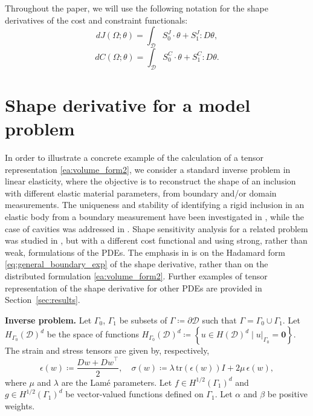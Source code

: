 \documentclass[preprint,9pt]{elsarticle}
\begin{document}
Throughout the paper, we will use the following notation for
the shape derivatives of the cost and constraint functionals:
\begin{equation}\label{dJ1}
	dJ(\Omega;\theta) = \int_{\mathcal{D}} S_0^J \cdot \theta + S_1^J : D\theta, 
\end{equation}
\begin{equation}\label{dC1}
	dC(\Omega;\theta) = \int_{\mathcal{D}} S_0^C \cdot \theta + S_1^C : D\theta .
\end{equation}

\section{Shape derivative for a model problem}\label{sec:model_prob}

In order to illustrate a concrete example of the calculation
of a tensor representation \eqref{ea:volume_form2}, we consider
a standard inverse problem in linear elasticity, where the objective
is to reconstruct the shape of an inclusion with different
elastic material parameters, from boundary and/or domain measurements.
The uniqueness and stability of identifying a rigid inclusion
in an elastic body from a boundary measurement have been investigated
in \cite{MR2522826}, while the case of cavities was addressed
in \cite{MR1772729}. Shape sensitivity analysis for a related problem
was studied in \cite{MEFTAHI20151554}, but with a different cost
functional and using strong, rather than weak,
formulations of the PDEs. The emphasis in \cite{MEFTAHI20151554}
is on the Hadamard form \eqref{eq:general_boundary_exp} of
the shape derivative, rather than on the distributed
formulation \eqref{ea:volume_form2}.
Further examples of tensor representation of the shape derivative
for other PDEs are provided in Section~\ref{sec:results}.

\textbf{Inverse problem.}
Let $\Gamma_0$, $\Gamma_1$ be subsets of $\Gamma\coloneqq\partial\mathcal{D}$
such that $\Gamma=\Gamma_0\cup\Gamma_1$. 
Let $H_{\Gamma_0}(\mathcal{D})^d$ be the space of functions
$
	H_{\Gamma_0}(\mathcal{D})^d\coloneqq
	\left\{ u\in H(\mathcal{D})^{d}\mid u|_{\Gamma_0}=\boldsymbol{0}\right\}. 
$
The strain and stress tensors are given by, respectively,
\[
	\epsilon(w) \coloneqq \frac{Dw+{Dw}^{\top}}{2},\quad
	\sigma(w) \coloneqq \lambda\,\mathrm{tr}(\epsilon(w))I + 2\mu\,\epsilon(w),
\]
where $\mu$ and $\lambda$ are the Lam\'e parameters.
Let $f\in H^{1/2}(\Gamma_1)^d$ and $g\in H^{1/2}(\Gamma_1)^d$
be vector-valued functions defined on $\Gamma_1$.
Let $\alpha$ and $\beta$ be positive weights.
\end{document}
